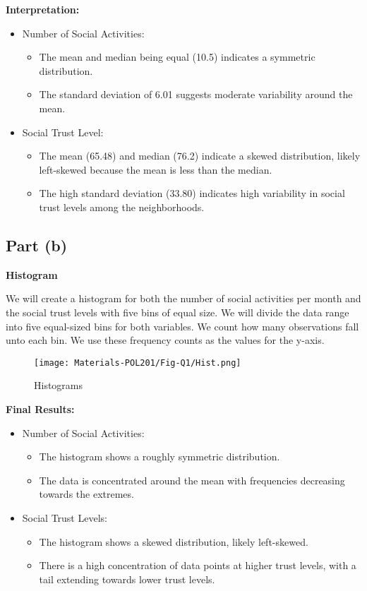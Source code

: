 \documentclass{article}
\begin{document}
\textbf{Interpretation:}
\begin{itemize}
    \item Number of Social Activities:
    \begin{itemize}
        \item The mean and median being equal (10.5) indicates a symmetric distribution.
        \item The standard deviation of 6.01 suggests moderate variability around the mean.
    \end{itemize}
    \item Social Trust Level:
    \begin{itemize}
        \item The mean (65.48) and median (76.2) indicate a skewed distribution, likely left-skewed because the mean is less than the median.
        \item The high standard deviation (33.80) indicates high variability in social trust levels among the neighborhoods.
    \end{itemize}
\end{itemize}

\subsection*{Part (b)}

\textbf{Histogram}

We will create a histogram for both the number of social activities per month and the social trust levels with five bins of equal size.
We will divide the data range into five equal-sized bins for both variables. We count how many observations fall unto each bin. We use these frequency counts as the values for the y-axis.

\begin{figure}[H]
    \centering
    \texttt{[image: Materials-POL201/Fig-Q1/Hist.png]}
    \caption{Histograms }
    \label{fig:fig1}
\end{figure}

\textbf{Final Results:}
\begin{itemize}
    \item Number of Social Activities:
    \begin{itemize}
        \item The histogram shows a roughly symmetric distribution.
        \item The data is concentrated around the mean with frequencies decreasing towards the extremes.
    \end{itemize}
    \item Social Trust Levels:
    \begin{itemize}
        \item The histogram shows a skewed distribution, likely left-skewed.
        \item There is a high concentration of data points at higher trust levels, with a tail extending towards lower trust levels.
    \end{itemize}
\end{itemize}
\end{document}
